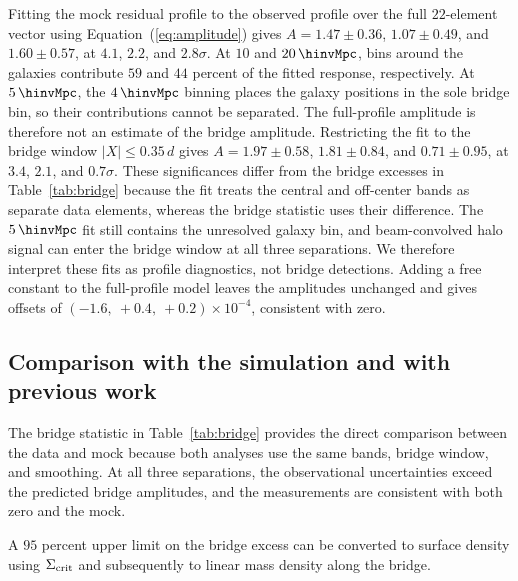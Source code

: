Fitting the mock residual profile to the observed profile over the full
$22$-element vector using Equation~(\ref{eq:amplitude}) gives
$A=1.47\pm0.36$, $1.07\pm0.49$, and $1.60\pm0.57$, at $4.1$, $2.2$, and
$2.8\sigma$.
At $10$ and $20\,\hinvMpc$, bins around the galaxies contribute $59$ and
$44$ percent of the fitted response, respectively. At $5\,\hinvMpc$, the
$4\,\hinvMpc$ binning places the galaxy positions in the sole bridge bin, so
their contributions cannot be separated. The full-profile amplitude is
therefore not an estimate of the bridge amplitude. Restricting the fit to the
bridge window
$|X|\leq0.35\,d$ gives $A=1.97\pm0.58$, $1.81\pm0.84$, and $0.71\pm0.95$, at
$3.4$, $2.1$, and $0.7\sigma$. These significances differ from the bridge
excesses in Table~\ref{tab:bridge} because the fit treats the central and
off-center bands as separate data elements, whereas the bridge statistic
uses their difference. The $5\,\hinvMpc$ fit still contains the unresolved
galaxy bin, and beam-convolved halo signal can enter the bridge window at all
three separations. We therefore interpret these fits as profile diagnostics,
not bridge detections. Adding a free constant to the full-profile model leaves
the amplitudes unchanged and gives offsets of
$\left(-1.6,\ +0.4,\ +0.2\right)\times10^{-4}$, consistent with zero.

\subsection{Comparison with the simulation and with previous work}
\label{sec:compare}

The bridge statistic in Table~\ref{tab:bridge} provides the direct comparison
between the data and mock because both analyses use the same bands, bridge
window, and smoothing. At all three separations, the observational
uncertainties exceed the predicted bridge amplitudes, and the measurements
are consistent with both zero and the mock.

A $95$ percent upper limit on the bridge excess can be converted to surface
density using $\Sigma_{\rm crit}$ and subsequently to linear mass density
along the bridge.

